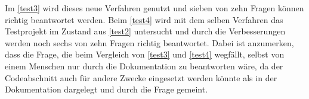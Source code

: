 \documentclass[../main.tex]{subfiles}
\begin{document}
Im \ref{test3} wird dieses neue Verfahren genutzt und sieben von zehn Fragen können richtig beantwortet werden.
Beim \ref{test4} wird mit dem selben Verfahren das Testprojekt im Zustand aus \ref{test2} untersucht und durch die Verbesserungen werden noch sechs von zehn Fragen richtig beantwortet.
Dabei ist anzumerken, dass die Frage, die beim Vergleich von \ref{test3} und \ref{test4} wegfällt, selbst von einem Menschen nur durch die Dokumentation zu beantworten wäre, da der Codeabschnitt auch für andere Zwecke eingesetzt werden könnte als in der Dokumentation dargelegt und durch die Frage gemeint.
\end{document}
